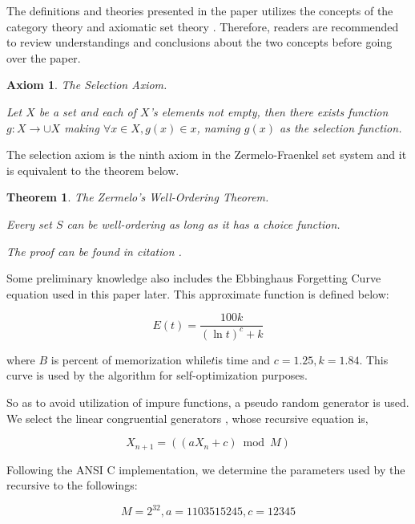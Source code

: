 \documentclass{aims}
\numberwithin{equation}{section}
\newtheorem{theorem}{Theorem}	%
\newtheorem{axiom}{Axiom}	%
\numberwithin{theorem}{section}	%
\numberwithin{axiom}{section}	%
\numberwithin{definition}{section}	%
\begin{document}
	The definitions and theories presented in the paper utilizes the concepts of the category theory \cite{Li2019} and axiomatic set theory \cite{Li2019}. Therefore, readers are recommended to review understandings and conclusions about the two concepts before going over the paper.
	
	\begin{axiom}
		The Selection Axiom.
		
		Let \(X\) be a set and each of \(X\){'}s elements not empty, then there exists function \(g:X\to \cup X\) making \(\forall x\in X,g(x)\in x\), naming \(g(x)\) as the selection function.
	\end{axiom}
	
	The selection axiom is the ninth axiom in the Zermelo-Fraenkel set system and it is equivalent to the theorem below.
	
	\begin{theorem}
		The Zermelo{'}s Well-Ordering Theorem.\cite{Li2019}
		
		Every set \(S\) can be well-ordering as long as it has a choice function.
		
		The proof can be found in citation \cite{Li2019}.
	\end{theorem}
	
	Some preliminary knowledge also includes the Ebbinghaus Forgetting Curve equation \cite{Ebbinghaus1913} used in this paper later. This approximate function is defined below:
	
	\begin{equation*}
		E(\mathit{t})=\frac{100 k}{(\ln  t)^c+k}
	\end{equation*}
	
	\noindent where \(B\) is percent of memorization while\(t\)is time and \(c=1.25,k=1.84\). This curve is used by the algorithm for self-optimization purposes.
	
	So as to avoid utilization of impure functions, a pseudo random generator is used. We select the linear congruential generators \cite{Entacher1997}, whose recursive equation is,
	
	\begin{equation*}
		X_{n+1}=(\left(a X_n+c\right) \bmod M)
	\end{equation*}
	
	Following the ANSI C implementation, we determine the parameters used by the recursive to the followings:
	
	\begin{equation*}
		M=2^{32},a=1103515245, c=12345
	\end{equation*}
	
\end{document}
